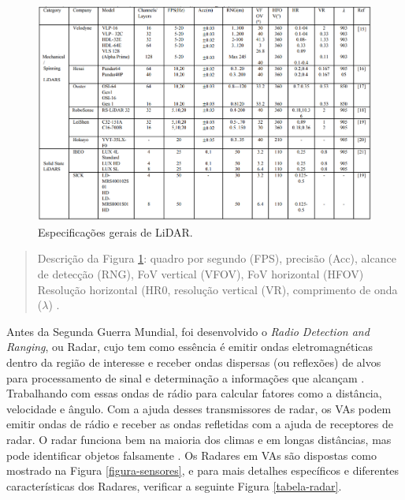 \begin{figure}[H]
\centering
\includegraphics[width=\textwidth]{Figures/lidar-table.png}
\caption{Especificações gerais de LiDAR.}
\label{tabela-lidar}
\end{figure}

\begin{quote}
Descrição da Figura \ref{tabela-lidar}: quadro por segundo (FPS), precisão (Acc), alcance de detecção (RNG), FoV vertical (VFOV), FoV horizontal (HFOV) Resolução horizontal (HR0, resolução vertical (VR), comprimento de onda ($\lambda$) \cite{sensors}.
\end{quote}





Antes da Segunda Guerra Mundial, foi desenvolvido o \textit{Radio Detection and Ranging}, ou Radar, cujo tem como essência é emitir ondas eletromagnéticas dentro da região de interesse e receber ondas dispersas (ou reflexões) de alvos para processamento de sinal e determinação a informações que alcançam \cite{sensors}. Trabalhando com essas ondas de rádio para calcular fatores como a distância, velocidade e ângulo. Com a ajuda desses transmissores de radar, os VAs podem emitir ondas de rádio e receber as ondas refletidas com a ajuda de receptores de radar. O radar funciona bem na maioria dos climas e em longas distâncias, mas pode identificar objetos falsamente \cite{review-auto}.
Os Radares em VAs são dispostas como mostrado na Figura \ref{figura-sensores}, e para mais detalhes específicos e diferentes características dos Radares, verificar a seguinte Figura \ref{tabela-radar}.



